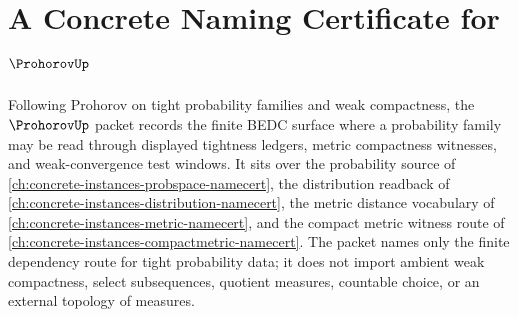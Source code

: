 \chapter{A Concrete Naming Certificate for $\ProhorovUp$}
\label{ch:concrete-instances-prohorov-namecert}

Following Prohorov on tight probability families and weak compactness, the $\ProhorovUp$ packet records the finite BEDC surface where a probability family may be read through displayed tightness ledgers, metric compactness witnesses, and weak-convergence test windows. It sits over the probability source of \autoref{ch:concrete-instances-probspace-namecert}, the distribution readback of \autoref{ch:concrete-instances-distribution-namecert}, the metric distance vocabulary of \autoref{ch:concrete-instances-metric-namecert}, and the compact metric witness route of \autoref{ch:concrete-instances-compactmetric-namecert}. The packet names only the finite dependency route for tight probability data; it does not import ambient weak compactness, select subsequences, quotient measures, countable choice, or an external topology of measures.

